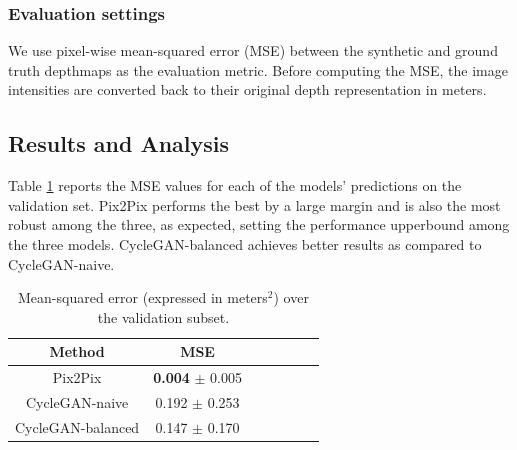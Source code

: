 \subsubsection{Evaluation settings}
We use pixel-wise mean-squared error (MSE) between the synthetic and ground truth depthmaps as the evaluation metric. Before computing the MSE, the image intensities are converted back to their original depth representation in meters.


\subsection{Results and Analysis}
Table \ref{tab:cleargrasp_quant} reports the MSE values for each of the models' predictions on the validation set. Pix2Pix performs the best by a large margin and is also the most robust among the three, as expected, setting the performance upperbound among the three models. CycleGAN-balanced achieves better results as compared to CycleGAN-naive. 

\begin{table}[h!]
    \small
    \centering
    \begin{tabular}{ccccccc}
        \textbf{Method} & \textbf{MSE} \\
        \hline
        Pix2Pix    & \textbf{0.004} $\pm$ 0.005 \\
        CycleGAN-naive    & 0.192 $\pm$ 0.253 \\
        CycleGAN-balanced    & 0.147 $\pm$ 0.170 \\
    \end{tabular}
    \caption{Mean-squared error (expressed in meters$^2$) over the validation subset.}
    \label{tab:cleargrasp_quant}
\end{table}

